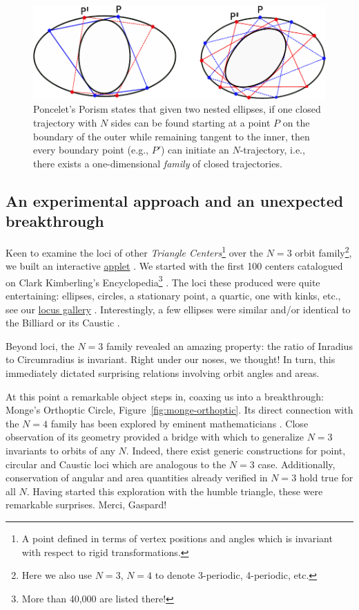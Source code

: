 \begin{figure}
    \centering
    \includegraphics[width=1.0\textwidth]{pics/u0003_poncelet_porism.pdf}
    \caption{Poncelet's Porism states that given two nested ellipses, if one closed trajectory with $N$ sides can be found starting at a point $P$ on the boundary of the outer
while remaining tangent to the inner, then every boundary point (e.g., $P'$) can initiate an $N$-trajectory, i.e., there exists a one-dimensional {\em family} of closed trajectories.}
\label{fig:poncelet-porism}
\end{figure}

\subsection{An experimental approach and an unexpected breakthrough}

Keen to examine the loci of other {\em Triangle Centers}\footnote{A point defined in terms of vertex positions and angles which is invariant with respect to rigid transformations.} over the $N=3$ orbit family\footnote{Here we also use $N=3$, $N=4$ to denote 3-periodic, 4-periodic, etc.}, we built an interactive \href{https://editor.p5js.org/undefined/present/i1Lin7lt7}{applet} \cite{dsr_applet_x12345}. We started with the first 100 centers catalogued on Clark Kimberling's Encyclopedia\footnote{More than 40,000 are listed there!} \cite{etc}. The loci these produced were quite entertaining: ellipses, circles, a stationary point, a quartic, one with kinks, etc., see our \href{https://dan-reznik.github.io/Elliptical-Billiards-Triangular-Orbits/loci_6tri.html}{locus gallery} \cite{reznik_media}. Interestingly, a few ellipses were similar and/or identical to the Billiard or its Caustic \cite{reznik2020-loci}. 

Beyond loci, the $N=3$ family revealed an amazing property: the ratio of Inradius to Circumradius is %
invariant. Right under our noses, we thought!
In turn, this immediately dictated surprising relations involving orbit angles and areas.

At this point a remarkable object steps in, coaxing us into a breakthrough: Monge's Orthoptic Circle,  Figure~\ref{fig:monge-orthoptic}. Its direct connection with the $N=4$ family has been explored by eminent mathematicians \cite{connes07}. Close observation of its geometry provided a bridge with which to generalize $N=3$ invariants to orbits of any $N$. Indeed, there exist generic constructions for point, circular and Caustic loci which are analogous to the $N=3$ case. Additionally, conservation of angular and area quantities already verified in $N=3$ hold true for all $N$. Having started this exploration with the humble triangle, these were remarkable surprises. Merci, Gaspard!

